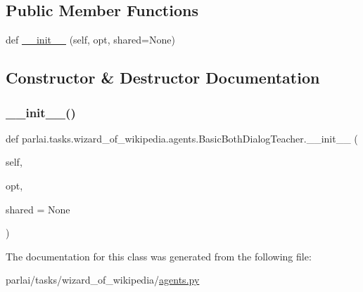 \subsection*{Public Member Functions}
\begin{DoxyCompactItemize}
\item 
def \hyperlink{classparlai_1_1tasks_1_1wizard__of__wikipedia_1_1agents_1_1BasicBothDialogTeacher_a8542415af7170c35c6c5844b28099072}{\+\_\+\+\_\+init\+\_\+\+\_\+} (self, opt, shared=None)
\end{DoxyCompactItemize}


\subsection{Constructor \& Destructor Documentation}
\mbox{\label{classparlai_1_1tasks_1_1wizard__of__wikipedia_1_1agents_1_1BasicBothDialogTeacher_a8542415af7170c35c6c5844b28099072}} 
\subsubsection{\texorpdfstring{\+\_\+\+\_\+init\+\_\+\+\_\+()}{\_\_init\_\_()}}
{\footnotesize\ttfamily def parlai.\+tasks.\+wizard\+\_\+of\+\_\+wikipedia.\+agents.\+Basic\+Both\+Dialog\+Teacher.\+\_\+\+\_\+init\+\_\+\+\_\+ (\begin{DoxyParamCaption}\item[{}]{self,  }\item[{}]{opt,  }\item[{}]{shared = {\ttfamily None} }\end{DoxyParamCaption})}



The documentation for this class was generated from the following file\+:\begin{DoxyCompactItemize}
\item 
parlai/tasks/wizard\+\_\+of\+\_\+wikipedia/\hyperlink{parlai_2tasks_2wizard__of__wikipedia_2agents_8py}{agents.\+py}\end{DoxyCompactItemize}
